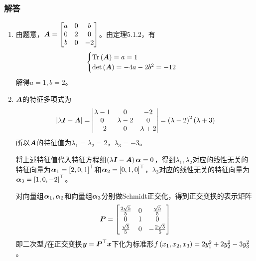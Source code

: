 \documentclass{beamer}
\begin{document}
\begin{frame}[allowframebreaks]
    \frametitle{解答}
    \begin{enumerate}
        \item {
              由题意，\(\boldsymbol{A}=\begin{bmatrix}a&0&b\\0&2&0\\b&0&-2\end{bmatrix}\)。由定理5.1.2，有
              \begin{equation*}
                  \begin{cases}
                      \mathrm{Tr}\left( \boldsymbol{A} \right)=a=1 \\
                      \mathrm{det}\left( \boldsymbol{A} \right)=-4a-2b^2=-12
                  \end{cases}
              \end{equation*}
              解得\(a=1,b=2\)。
              }
        \item {
              \(\boldsymbol{A}\)的特征多项式为
              \begin{equation*}
                  \left|\lambda\boldsymbol{I}-\boldsymbol{A} \right|=\begin{vmatrix}\lambda-1&0&-2\\0&\lambda-2&0\\-2&0&\lambda+2\end{vmatrix}=\left( \lambda-2 \right)^2\left( \lambda+3 \right)
              \end{equation*}
              所以\(\boldsymbol{A}\)的特征值为\(\lambda_1=\lambda_2=2\)，\(\lambda_3=-3\)。

              将上述特征值代入特征方程组\(\left( \lambda\boldsymbol{I}-\boldsymbol{A} \right)\boldsymbol{\alpha}=0\)，得到\(\lambda_1,\lambda_2\)对应的线性无关的特征向量为\(\boldsymbol{\alpha}_1=\left[ 2,0,1 \right]^\top\)和\(\boldsymbol{\alpha}_2=\left[ 0,1,0 \right]^\top\)，\(\lambda_3\)对应的线性无关的特征向量为\(\boldsymbol{\alpha}_3=\left[ 1,0,-2 \right]^\top\)。

              对向量组\(\boldsymbol{\alpha}_1,\boldsymbol{\alpha}_2\)和向量组\(\boldsymbol{\alpha}_3\)分别做Schmidt正交化，得到正交变换的表示矩阵
              \begin{equation*}
                  \boldsymbol{P}=
                  \begin{bmatrix}
                      \frac{2\sqrt{5}}{5} & 0 & \frac{\sqrt{5}}{5}   \\
                      0                   & 1 & 0                    \\
                      \frac{\sqrt{5}}{5}  & 0 & -\frac{2\sqrt{5}}{5}
                  \end{bmatrix}
              \end{equation*}
              即二次型\(f\)在正交变换\(\boldsymbol{y}=\boldsymbol{P}^\top\boldsymbol{x}\)下化为标准形\(f\left( x_1,x_2,x_3 \right)=2y_1^2+2y_2^2-3y_3^2\)。
              }
    \end{enumerate}
\end{frame}
\end{document}
